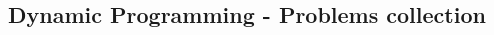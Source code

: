 \documentclass[10pt,oneside]{article}
\begin{document}
\begin{landscape}
\begin{multicols}{2}

\section{Dynamic Programming - Problems collection}







\end{multicols}
\end{landscape}
\end{document}
